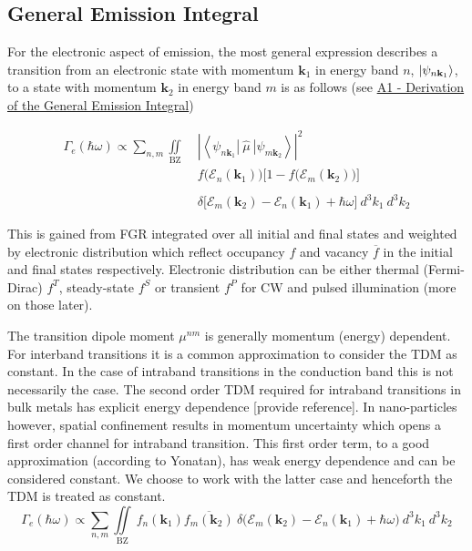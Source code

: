 \newpage
\subsection{General Emission Integral}
\label{sec:general_emission_integral}

For the electronic aspect of emission, the most general expression describes a transition from an electronic state with momentum $\mathbf{k}_{1}$ in energy band $n$, $\ket{\psi_{n\mathbf{k}_{1}}}$, to a state with momentum $\mathbf{k}_{2}$ in energy band $m$ is as follows (see \hyperref[app:derivation_general_emission_integral]{A1 - Derivation of the General Emission Integral})

\begin{align}
\Gamma_{e}(\hbar\omega) \propto \sum_{n, m} \iint\limits_{\text{BZ}} \;  &\left| \left\langle \psi_{n\mathbf{k}_{1}} | \ \hat{\mu} \ |\psi_{m\mathbf{k}_{2}}\right\rangle\right|^{2}  \\ &f\Big( \mathcal{E}_{n}(\mathbf{k}_{1}) \Big)\Bigg[ 1-f\Big( \mathcal{E}_{m}(\mathbf{k}_{2}) \Big)\Bigg] \\  \\ &\delta\Big[\mathcal{E}_{m}(\mathbf{k}_{2}) - \mathcal{E}_{n}(\mathbf{k}_{1}) + \hbar\omega \Big] \ d^{3}k_{1} \ d^{3}k_{2}
\label{eq:general_emission_integral}
\end{align}

This is gained from FGR integrated over all initial and final states and weighted by electronic distribution which reflect occupancy $f$ and vacancy $\overline{f}$ in the initial and final states respectively. Electronic distribution can be either thermal (Fermi-Dirac) $f^{T}$, steady-state $f^{S}$ or transient $f^{P}$ for CW and pulsed illumination (more on those later). 

The transition dipole moment $\mu^{nm}$ is generally momentum (energy) dependent. For interband transitions it is a common approximation to consider the TDM as constant. In the case of intraband transitions in the conduction band this is not necessarily the case. The second order TDM required for intraband transitions in bulk metals has explicit energy dependence [provide reference]. In nano-particles however, spatial confinement results in momentum uncertainty which opens a first order channel for intraband transition. This first order term, to a good approximation (according to Yonatan), has weak energy dependence and can be considered constant. We choose to work with the latter case and henceforth the TDM is treated as constant. 
\begin{equation}
\Gamma_{e}(\hbar\omega) \propto \sum_{n, m} \iint\limits_{\text{BZ}}  \ f_{n}(\mathbf{k}_{1})\overline{f_{m}(\mathbf{k}_{2})} \ \delta\big(\mathcal{E}_{m}(\mathbf{k}_{2}) - \mathcal{E}_{n}(\mathbf{k}_{1}) + \hbar\omega \big) \ d^{3}k_{1} \ d^{3}k_{2}
\label{eq:general_emission_integral_constant_tdm}
\end{equation}
